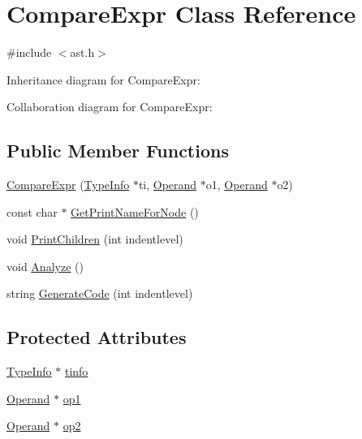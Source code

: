 \hypertarget{class_compare_expr}{}\section{Compare\+Expr Class Reference}
\label{class_compare_expr}


{\ttfamily \#include $<$ast.\+h$>$}



Inheritance diagram for Compare\+Expr\+:


Collaboration diagram for Compare\+Expr\+:
\subsection*{Public Member Functions}
\begin{DoxyCompactItemize}
\item 
\hyperlink{class_compare_expr_aea18e0dd8ae60cd31dc4cc0ff6c826ea}{Compare\+Expr} (\hyperlink{class_type_info}{Type\+Info} $\ast$ti, \hyperlink{class_operand}{Operand} $\ast$o1, \hyperlink{class_operand}{Operand} $\ast$o2)
\item 
const char $\ast$ \hyperlink{class_compare_expr_a28dc1cb43c2251d78c7ac8f443760f2f}{Get\+Print\+Name\+For\+Node} ()
\item 
void \hyperlink{class_compare_expr_a0a29abbf82133a8a39f5540e68b9b798}{Print\+Children} (int indentlevel)
\item 
void \hyperlink{class_compare_expr_a6433597757238a3332c637c1ad67ea87}{Analyze} ()
\item 
string \hyperlink{class_compare_expr_a5e5388b4d036996fc32913efd3ab3123}{Generate\+Code} (int indentlevel)
\end{DoxyCompactItemize}
\subsection*{Protected Attributes}
\begin{DoxyCompactItemize}
\item 
\hyperlink{class_type_info}{Type\+Info} $\ast$ \hyperlink{class_compare_expr_a023d7d23d623b0f2545756e2ffbae522}{tinfo}
\item 
\hyperlink{class_operand}{Operand} $\ast$ \hyperlink{class_compare_expr_a5c8876f3b3d13cceaeef338e2db519f7}{op1}
\item 
\hyperlink{class_operand}{Operand} $\ast$ \hyperlink{class_compare_expr_a3f32ffb22ac225f4581b284a9f97f2e7}{op2}
\end{DoxyCompactItemize}


